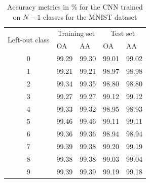 \documentclass[10pt]{article}
\begin{document}
\begin{table}[H]
\centering
    \begin{tabular}{cllll}
    \toprule
    \multirow{2}{*}{Left-out class} & \multicolumn{2}{c}{Training set} & \multicolumn{2}{c}{Test set} \\
                   & OA    & AA    & OA    & AA    \\\midrule
    0              & 99.29 & 99.30 & 99.01 & 99.02 \\
    1              & 99.21 & 99.21 & 98.97 & 98.98 \\
    2              & 99.34 & 99.35 & 98.80 & 98.80 \\
    3              & 99.27 & 99.27 & 99.12 & 99.12 \\
    4              & 99.33 & 99.32 & 98.95 & 98.93 \\
    5              & 99.46 & 99.46 & 99.11 & 99.11 \\
    6              & 99.36 & 99.36 & 98.94 & 98.94 \\
    7              & 99.39 & 99.38 & 99.20 & 99.19 \\
    8              & 99.38 & 99.38 & 99.03 & 99.04 \\
    9              & 99.39 &  99.39 &  99.19 &  99.18\\\bottomrule
    \end{tabular}
    \caption{Accuracy metrics in \% for the \gls{CNN} trained on $N-1$ classes for the MNIST dataset}
    \label{table:mnist-nd-accuracy}
\end{table}
\end{document}
